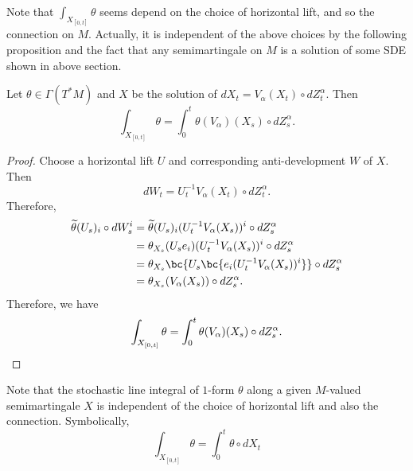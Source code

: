 Note that $\int_{X_{[0,t]}} \theta$ seems depend on the choice of horizontal lift, and so the connection on $M$. Actually, it is independent of the above choices by the following proposition and the fact that any semimartingale on $M$ is a solution of some SDE shown in above section.
\begin{prop}
    Let $\theta \in \Gamma(T^*M)$ and $X$ be the solution of $dX_t = V_\alpha(X_t) \circ dZ_t^\alpha$. Then
    \begin{equation*}
        \int_{X_{[0,t]}} \theta = \int_0^t \theta(V_\alpha)(X_s) \circ dZ^\alpha_s.
    \end{equation*}
\end{prop}
\begin{proof}
    Choose a horizontal lift $U$ and corresponding anti-development $W$ of $X$. Then
    \begin{equation*}
        dW_t = U_t^{-1}V_\alpha(X_t) \circ dZ_t^\alpha.
    \end{equation*} 
    Therefore,
    \begin{align*}
        \widetilde{\theta}(U_s)_i \circ dW^i_s &= \widetilde{\theta}(U_s)_i(U_t^{-1}V_\alpha(X_s))^i \circ dZ_s^\alpha \\
        &= \theta_{X_s}(U_se_i)(U_t^{-1}V_\alpha(X_s))^i \circ dZ_s^\alpha \\
        &= \theta_{X_s}\bc{U_s \bc{e_i(U_t^{-1}V_\alpha(X_s))^i}}\circ dZ_s^\alpha \\
        &= \theta_{X_s}(V_\alpha(X_s))\circ dZ_s^\alpha.
    \end{align*}
    Therefore, we have
    \begin{equation*}
        \int_{X_{[0,t]}} \theta = \int_0^t \theta(V_\alpha)(X_s) \circ dZ^\alpha_s. \qedhere
    \end{equation*}
\end{proof}
\begin{rmk}
    Note that the stochastic line integral of $1$-form $\theta$ along a given $M$-valued semimartingale $X$ is independent of the choice of horizontal lift and also the connection. Symbolically,
    \begin{equation*}
        \int_{X_{[0,t]}} \theta = \int_0^t \theta \circ dX_t
    \end{equation*}
\end{rmk}

